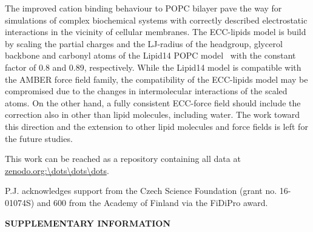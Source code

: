 \documentclass[aip,jcp,twocolumn]{revtex4}
\begin{document}
The improved cation binding behaviour to POPC bilayer pave the way for
simulations of complex biochemical systems with correctly described
electrostatic interactions in the vicinity of cellular membranes.
The ECC-lipids model is build by scaling the partial charges
and the LJ-radius of the headgroup, glycerol backbone and carbonyl atoms of
the Lipid14 POPC model~\cite{dickson14} with the constant factor
of 0.8 and 0.89, respectively. While the Lipid14 model
is compatible with the AMBER force field family, the compatibility of
the ECC-lipids model may be compromised due to the changes in intermolecular
interactions of the scaled atoms. On the other hand, a fully consistent
ECC-force field should include the correction also in other than lipid
molecules, including water. The work toward this direction and the extension
to other lipid molecules and force fields is left for the future studies.





This work can be reached as a repository containing all data at \url{zenodo.org:\dots\dots\dots}.



\begin{acknowledgments}
P.J. acknowledges support from the Czech Science Foundation (grant no. 16-01074S) 
and 600 from the Academy of Finland via the FiDiPro award.
\end{acknowledgments}


\newpage
\newpage
\appendix






\begin{center}
{\bf SUPPLEMENTARY INFORMATION}
\end{center}
\end{document}
